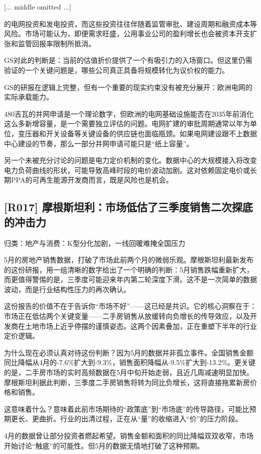 \documentclass[11pt]{ctexart}
\begin{document}
[... middle omitted ...]

的电网投资和发电投资，而这些投资往往伴随着监管审批、建设周期和融资成本等风险。市场可能认为，即便需求旺盛，公用事业公司的盈利增长也会被资本开支扩张和监管回报率限制所抵消。

GS对此的判断是：当前的估值折价提供了一个有吸引力的入场窗口。但这里仍需验证的一个关键问题是，哪些公司真正具备将规模转化为议价权的能力。

GS的研报在逻辑上完整，但有一个重要的现实约束没有被充分展开：欧洲电网的实际承载能力。

480吉瓦的并网申请是一个理论数字，但欧洲的电网基础设施能否在2035年前消化这么多新增容量，是一个需要独立评估的问题。电网扩建的审批周期通常以年为单位，变压器和开关设备等关键设备的供应链也面临瓶颈。如果电网建设跟不上数据中心建设的节奏，那么一部分并网申请可能只是“纸上容量”。

另一个未被充分讨论的问题是电力定价机制的变化。数据中心的大规模接入将改变电力负荷曲线的形状，可能导致高峰时段的电价波动加剧。这对依赖固定电价或长期PPA的可再生能源开发商而言，既是风险也是机会。

\subsection{[R017] 摩根斯坦利：市场低估了三季度销售二次探底的冲击力}
{\small\color{refgray}归类：地产与消费：K型分化加剧，一线回暖难掩全国压力}

5月的房地产销售数据，打破了市场此前两个月的微弱乐观。摩根斯坦利最新发布的这份研报，用一组清晰的数字给出了一个明确的判断：5月销售跌幅重新扩大，而更值得警惕的是，三季度可能迎来年内第二轮深度下滑。这不是一次简单的数据波动，而是行业结构性压力的再次确认。

这份报告的价值不在于告诉你“市场不好”——这已经是共识。它的核心洞察在于：市场正在低估两个关键变量——二手房销售从放缓转向负增长的传导效应，以及开发商在土地市场上近乎停摆的谨慎姿态。这两个因素叠加，正在重塑下半年的行业定价逻辑。

为什么现在必须认真对待这份判断？因为5月的数据并非孤立事件。全国销售金额同比降幅从4月的-7.6\%扩大到-9.3\%，销售面积降幅从-9.5\%扩大到-13.2\%。更关键的是，二手房市场的实时高频数据在5月中旬开始走弱，且近几周减速明显加快。摩根斯坦利据此判断，三季度二手房销售将转为同比负增长，这将直接拖累新房价格和销售。

这意味着什么？意味着此前市场期待的“政策底”到“市场底”的传导路径，可能比预期更长、更曲折。行业的出清过程，正在从“量”的收缩进入“价”的压力阶段。

4月的数据曾让部分投资者燃起希望。销售金额和面积的同比降幅双双收窄，市场开始讨论“触底”的可能性。但5月的数据无情地打破了这种预期。
\end{document}
